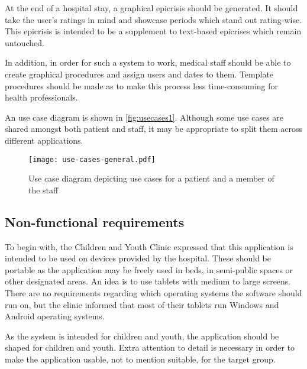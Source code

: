 At the end of a hospital stay, a graphical epicrisis should be generated. It should take the user's ratings in mind and showcase periods which stand out rating-wise. This epicrisis is intended to be a supplement to text-based epicrises which remain untouched.

In addition, in order for such a system to work, medical staff should be able to create graphical procedures and assign users and dates to them. Template procedures should be made as to make this process less time-consuming for health professionals.

An use case diagram is shown in \autoref{fig:usecases1}. Although some use cases are shared amongst both patient and staff, it may be appropriate to split them across different applications.

\begin{figure}
    \centering
    \texttt{[image: use-cases-general.pdf]}
    \caption{Use case diagram depicting use cases for a patient and a member of the staff}
    \label{fig:usecases1}
\end{figure}

\subsection{Non-functional requirements}

To begin with, the Children and Youth Clinic expressed that this application is intended to be used on devices provided by the hospital. These should be portable as the application may be freely used in beds, in semi-public spaces or other designated areas. An idea is to use tablets with medium to large screens. There are no requirements regarding which operating systems the software should run on, but the clinic informed that most of their tablets run Windows and Android operating systems.

As the system is intended for children and youth, the application should be shaped for children and youth. Extra attention to detail is necessary in order to make the application usable, not to mention suitable, for the target group.
